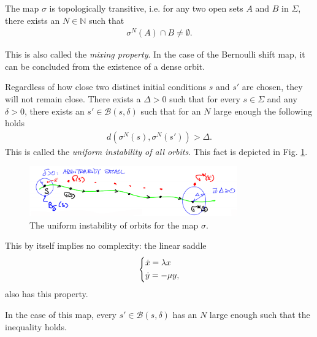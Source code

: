 \begin{proposition}[]
	The map $\sigma$ is topologically transitive, i.e. for any two open sets $A$ and $B$ in $\Sigma$, there exists an $N \in \mathbb{N}$ such that
	\begin{align}
		\sigma^{N}(A) \cap B \neq \emptyset.
	\end{align}
\end{proposition}
	This is also called the \emph{mixing property}. In the case of the Bernoulli shift map, it can be concluded from the existence of a dense orbit.
\begin{proposition}
	Regardless of how close two distinct initial conditions $s$ and $s'$ are chosen, they will not remain close. There exists a $\Delta>0$ such that for every $s\in\Sigma$ and any $\delta>0$, there exists an $s' \in \mathcal{B}\left(s, \delta\right)$ such that for an $N$ large enough the following holds
	\begin{align}
		d(\sigma^{N}(s), \sigma^{N}(s') ) > \Delta.
	\end{align}
	This is called the \emph{uniform instability of all orbits}. This fact is depicted in Fig. \ref{fig:unif_instab}.	
\end{proposition}

\begin{figure}[h!]
	\centering
	\includegraphics[width=0.8\textwidth]{figures/ch6/22unif_instab.png}
	\caption{The uniform instability of orbits for the map $\sigma$.}
	\label{fig:unif_instab}
\end{figure}

\begin{remark}[]
	This by itself implies no complexity: the linear saddle
	\begin{align}
		\begin{dcases}
			\dot{x} = \lambda x \\
			\dot{y} = - \mu y,
		\end{dcases}
	\end{align}
also has this property.	
\end{remark}

\begin{remark}[]
	In the case of this map, every $s'\in \mathcal{B}\left(s, \delta \right)$ has an $N$ large enough such that the inequality holds.
\end{remark}

